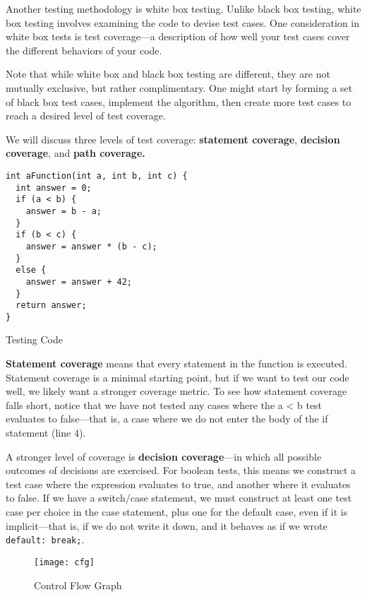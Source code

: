 \documentclass[11pt, a4paper]{article}
\begin{document}
Another testing methodology is white box testing. Unlike black box testing, white box testing involves examining the code to devise test cases. One consideration in white box tests is test coverage—a description of how well your test cases cover the different behaviors of your code.



Note that while white box and black box testing are different, they are not mutually exclusive, but rather complimentary. One might start by forming a set of black box test cases, implement the algorithm, then create more test cases to reach a desired level of test coverage.

We will discuss three levels of test coverage: \textbf{statement coverage}, \textbf{decision coverage}, and \textbf{path coverage.}

\begin{listing}
\begin{verbatim}
int aFunction(int a, int b, int c) {
  int answer = 0;
  if (a < b) {
    answer = b - a;
  }
  if (b < c) {
    answer = answer * (b - c);
  }
  else {
    answer = answer + 42;
  }
  return answer;
}
\end{verbatim}
\caption{Testing Code}
\label{lst:testing_code}
\end{listing}



\textbf{Statement coverage} means that every statement in the function is executed. 
Statement coverage is a minimal starting point, but if we want to test our code well, we likely want a stronger coverage metric. To see how statement coverage falls short, notice that we have not tested any cases where the a < b test evaluates to false—that is, a case where we do not enter the body of the if statement (line 4).


A stronger level of coverage is \textbf{decision coverage}—in which all possible outcomes of decisions are exercised. For boolean tests, this means we construct a test case where the expression evaluates to true, and another where it evaluates to false. If we have a switch/case statement, we must construct at least one test case per choice in the case statement, plus one for the default case, even if it is implicit—that is, if we do not write it down, and it behaves as if we wrote \texttt{default: break;}.


\begin{figure}[htpb]
  \centering
  \texttt{[image: cfg]}
  \caption{Control Flow Graph}
  \label{fig:control_flow_graph}
\end{figure}
\end{document}
